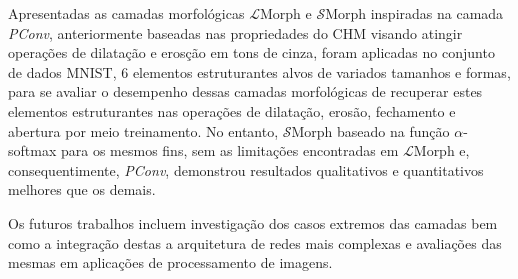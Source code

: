 Apresentadas as camadas morfológicas $\mathcal{L}$Morph e $\mathcal{S}$Morph inspiradas na camada \emph{PConv}, anteriormente baseadas nas propriedades do CHM visando atingir operações de dilatação e erosção em tons de cinza, foram aplicadas no conjunto de dados MNIST, 6 elementos estruturantes alvos de variados tamanhos e formas, para se avaliar o desempenho dessas camadas morfológicas de recuperar estes elementos estruturantes nas operações de dilatação, erosão, fechamento e abertura por meio treinamento.
No entanto, $\mathcal{S}$Morph baseado na função $\alpha$-softmax para os mesmos fins, sem as limitações encontradas em $\mathcal{L}$Morph e, consequentimente, \emph{PConv}, demonstrou resultados qualitativos e quantitativos melhores que os demais.

Os futuros trabalhos incluem investigação dos casos extremos das camadas bem como a integração destas a arquitetura de redes mais complexas e avaliações das mesmas em aplicações de processamento de imagens.